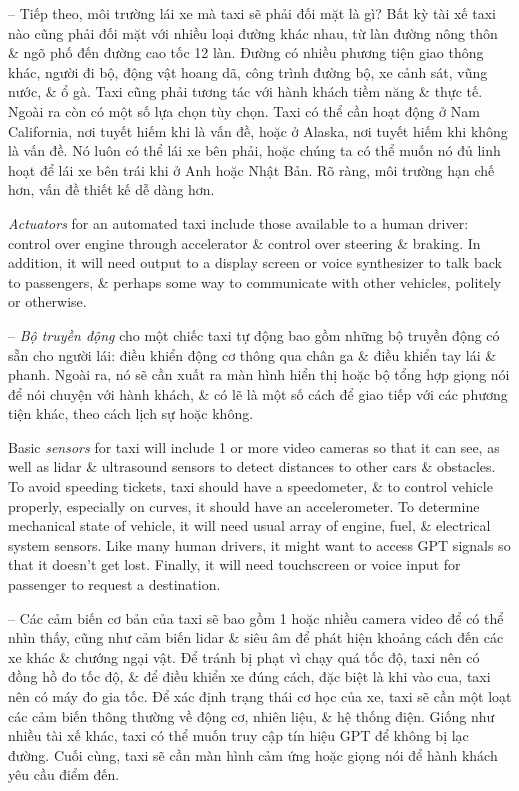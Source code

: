 \documentclass{article}
\begin{document}
\begin{itemize}
\begin{itemize}
\begin{itemize}
\begin{itemize}
				-- Tiếp theo, môi trường lái xe mà taxi sẽ phải đối mặt là gì? Bất kỳ tài xế taxi nào cũng phải đối mặt với nhiều loại đường khác nhau, từ làn đường nông thôn \& ngõ phố đến đường cao tốc 12 làn. Đường có nhiều phương tiện giao thông khác, người đi bộ, động vật hoang dã, công trình đường bộ, xe cảnh sát, vũng nước, \& ổ gà. Taxi cũng phải tương tác với hành khách tiềm năng \& thực tế. Ngoài ra còn có một số lựa chọn tùy chọn. Taxi có thể cần hoạt động ở Nam California, nơi tuyết hiếm khi là vấn đề, hoặc ở Alaska, nơi tuyết hiếm khi không là vấn đề. Nó luôn có thể lái xe bên phải, hoặc chúng ta có thể muốn nó đủ linh hoạt để lái xe bên trái khi ở Anh hoặc Nhật Bản. Rõ ràng, môi trường hạn chế hơn, vấn đề thiết kế dễ dàng hơn.
				
				{\it Actuators} for an automated taxi include those available to a human driver: control over engine through accelerator \& control over steering \& braking. In addition, it will need output to a display screen or voice synthesizer to talk back to passengers, \& perhaps some way to communicate with other vehicles, politely or otherwise.
				
				-- {\it Bộ truyền động} cho một chiếc taxi tự động bao gồm những bộ truyền động có sẵn cho người lái: điều khiển động cơ thông qua chân ga \& điều khiển tay lái \& phanh. Ngoài ra, nó sẽ cần xuất ra màn hình hiển thị hoặc bộ tổng hợp giọng nói để nói chuyện với hành khách, \& có lẽ là một số cách để giao tiếp với các phương tiện khác, theo cách lịch sự hoặc không.
				
				Basic {\it sensors} for taxi will include 1 or more video cameras so that it can see, as well as lidar \& ultrasound sensors to detect distances to other cars \& obstacles. To avoid speeding tickets, taxi should have a speedometer, \& to control vehicle properly, especially on curves, it should have an accelerometer. To determine mechanical state of vehicle, it will need usual array of engine, fuel, \& electrical system sensors. Like many human drivers, it might want to access GPT signals so that it doesn't get lost. Finally, it will need touchscreen or voice input for passenger to request a destination.
				
				-- Các cảm biến cơ bản của taxi sẽ bao gồm 1 hoặc nhiều camera video để có thể nhìn thấy, cũng như cảm biến lidar \& siêu âm để phát hiện khoảng cách đến các xe khác \& chướng ngại vật. Để tránh bị phạt vì chạy quá tốc độ, taxi nên có đồng hồ đo tốc độ, \& để điều khiển xe đúng cách, đặc biệt là khi vào cua, taxi nên có máy đo gia tốc. Để xác định trạng thái cơ học của xe, taxi sẽ cần một loạt các cảm biến thông thường về động cơ, nhiên liệu, \& hệ thống điện. Giống như nhiều tài xế khác, taxi có thể muốn truy cập tín hiệu GPT để không bị lạc đường. Cuối cùng, taxi sẽ cần màn hình cảm ứng hoặc giọng nói để hành khách yêu cầu điểm đến.
				

\end{itemize}
\end{itemize}
\end{itemize}
\end{itemize}
\end{document}
